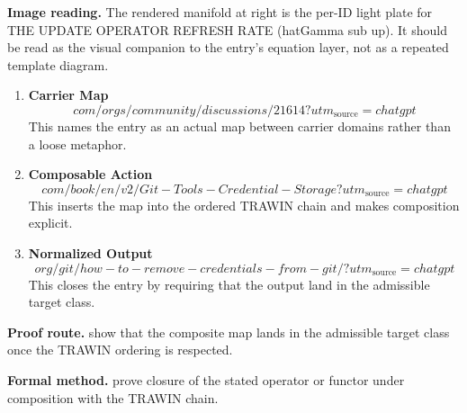 \begin{samepage}
\noindent\begin{minipage}[t]{0.45\linewidth}
\vspace{0pt}
\raggedright
\scriptsize\textbf{Image reading.} The rendered manifold at right is the per-ID light plate for THE UPDATE OPERATOR REFRESH RATE (hatGamma sub up). It should be read as the visual companion to the entry's equation layer, not as a repeated template diagram.\par
\end{minipage}\hfill
\begin{minipage}[t]{0.53\linewidth}
\vspace*{-0.10in}
\raggedright
{}
\end{minipage}
\end{samepage}

\clearpage


\begin{enumerate}[leftmargin=1.6em,itemsep=9pt,topsep=6pt]
\item \textbf{Carrier Map}
\[
com/orgs/community/discussions/21614?utm_{\mathrm{source}}=chatgpt
\]
This names the entry as an actual map between carrier domains rather than a loose metaphor.

\item \textbf{Composable Action}
\[
com/book/en/v2/Git-Tools-Credential-Storage?utm_{\mathrm{source}}=chatgpt
\]
This inserts the map into the ordered TRAWIN chain and makes composition explicit.

\item \textbf{Normalized Output}
\[
org/git/how-to-remove-credentials-from-git/?utm_{\mathrm{source}}=chatgpt
\]
This closes the entry by requiring that the output land in the admissible target class.
\end{enumerate}

\textbf{Proof route.} show that the composite map lands in the admissible target class once the TRAWIN ordering is respected.

\textbf{Formal method.} prove closure of the stated operator or functor under composition with the TRAWIN chain.

\medskip
{}

